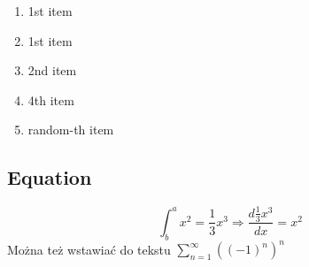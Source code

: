 \begin{enumerate}
    \item 1st item
    \item 1st item
    \item \Large 2nd item \small
    \item 4th item
    \item random-th item
\end{enumerate}

\subsection{Equation}

\begin{equation}
    \int_b^a x^2 = \frac{1}{3} x^3 \Rightarrow \frac{d \frac{1}{3} x^3}{dx} = x^2
\end{equation}
Można też wstawiać do tekstu $\sum_{n=1} ^{\infty} ((-1)^n)^n$
